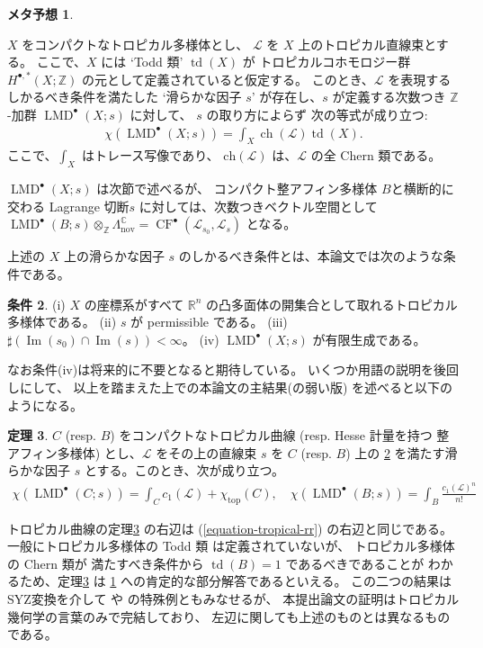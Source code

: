 \documentclass[uplatex,dvipdfmx,12pt]{jsarticle}
\numberwithin{equation}{section}
\theoremstyle{definition}
\newtheorem{theorem}{定理}[section]
\newtheorem{condition}[theorem]{条件}
\newtheorem{expectation}[theorem]{メタ予想}
\newcommand{\opn}[1]{\operatorname{#1}}
\begin{document}
\begin{expectation} \label{conjecture-mirror-tropical-rr}

$X$ をコンパクトなトロピカル多様体とし、
$\mathcal{L}$ を $X$ 上のトロピカル直線束とする。
ここで、$X$ には `Todd 類' $\opn{td}(X)$ が
トロピカルコホモロジー群 $H^{\bullet,*}(X;\mathbb{Z})$
の元として定義されていると仮定する。
このとき、$\mathcal{L}$ を表現するしかるべき条件を満たした
`滑らかな因子 $s$' が存在し、$s$ が定義する次数つき
$\mathbb{Z}$-加群 $\opn{LMD}^{\bullet}(X;s)$ に対して、
$s$ の取り方によらず
次の等式が成り立つ:
\begin{align}
\chi(\opn{LMD}^{\bullet}(X;s))=\int_{X}\opn{ch}(\mathcal{L})\opn{td}(X).
\end{align}
ここで、$\int_X$ はトレース写像であり、
$\mathrm{ch}(\mathcal{L})$ は、$\mathcal{L}$ の全 Chern 類である。
\end{expectation}
$\opn{LMD}^{\bullet}(X;s)$ は次節で述べるが、
コンパクト整アフィン多様体 $B$と横断的に交わる Lagrange 切断$s$
に対しては、次数つきベクトル空間として
$\opn{LMD}^{\bullet}(B;s)\otimes_{\mathbb{Z}}
\Lambda^{\mathbb{C}}_{\mathrm{nov}}=
\opn{CF}^{\bullet}(\mathscr{L}_{s_0},
\mathscr{L}_s)$ となる。

上述の $X$ 上の滑らかな因子 $s$ のしかるべき条件とは、本論文では次のような条件である。

\begin{condition} \label{condition-good}
(i) $X$ の座標系がすべて $\mathbb{R}^{n}$ 
の凸多面体の開集合として取れるトロピカル多様体である。
(ii) $s$ が permissible である。
(iii) $\sharp (\opn{Im}(s_0)\cap \opn{Im}(s))<\infty$。
(iv) $\opn{LMD}^{\bullet}(X;s)$ が有限生成である。
\end{condition}
なお条件(iv)は将来的に不要となると期待している。
いくつか用語の説明を後回しにして、
以上を踏まえた上での本論文の主結果(の弱い版)
を述べると以下のようになる。

\begin{theorem} \label{theorem-main}
$C$ (resp. $B$) をコンパクトなトロピカル曲線 (resp. Hesse 計量を持つ
整アフィン多様体) とし、$\mathcal{L}$ をその上の直線束
$s$ を $C$ (resp. $B$) 上の
\cref{condition-good} を満たす滑らかな因子 $s$ 
とする。このとき、次が成り立つ。
\begin{align}
\chi(\opn{LMD}^{\bullet}(C;s))=\int_C c_1(\mathcal{L})+
\chi_{\opn{top}}(C), \quad
\chi(\opn{LMD}^{\bullet}(B;s))=\int_B \frac{c_1(\mathcal{L})^n}{n!}
\end{align}
\end{theorem}
トロピカル曲線の定理\ref{theorem-main} の右辺は
(\ref{equation-tropical-rr}) の右辺と同じである。
一般にトロピカル多様体の Todd 類 は定義されていないが、
トロピカル多様体の Chern 類が
満たすべき条件から $\opn{td}(B)=1$ であるべきであることが
わかるため、定理\ref{theorem-main} は
\cref{conjecture-mirror-tropical-rr}
への肯定的な部分解答であるといえる。
この二つの結果はSYZ変換を介して \cite{MR4301560} や 
\cite{auroux2022lagrangian} の特殊例ともみなせるが、
本提出論文の証明はトロピカル幾何学の言葉のみで完結しており、
左辺に関しても上述のものとは異なるものである。
\end{document}

